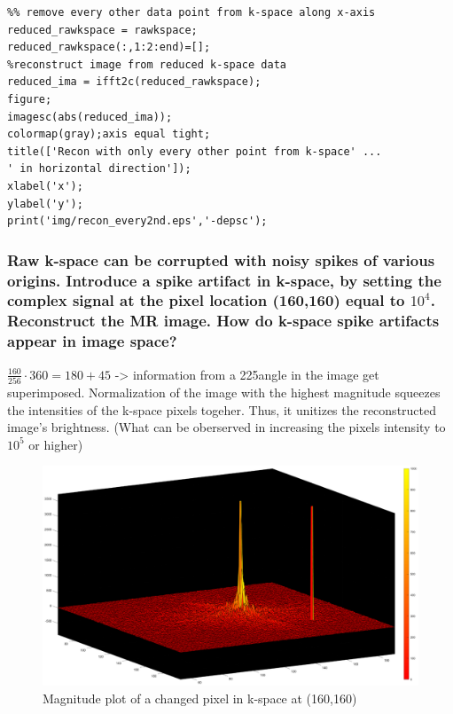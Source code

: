 \begin{lstlisting}
%% remove every other data point from k-space along x-axis
reduced_rawkspace = rawkspace;
reduced_rawkspace(:,1:2:end)=[];
%reconstruct image from reduced k-space data
reduced_ima = ifft2c(reduced_rawkspace);
figure;
imagesc(abs(reduced_ima));
colormap(gray);axis equal tight;
title(['Recon with only every other point from k-space' ...
' in horizontal direction']);
xlabel('x');
ylabel('y');
print('img/recon_every2nd.eps','-depsc');
\end{lstlisting}




\subsubsection{Raw k-space can be corrupted with noisy spikes of various origins. Introduce a spike
artifact in k-space, by setting the complex signal at the pixel location (160,160) equal to $10^4$. Reconstruct the MR image. How do k-space spike artifacts appear in image space?}


$\frac{160}{256} \cdot 360 = 180 + 45 $ -> information from a 225\textdegree angle in the image get superimposed. Normalization of the image with the highest magnitude squeezes the intensities of the k-space pixels togeher. Thus, it unitizes the reconstructed image's brightness. (What can be oberserved in increasing the pixels intensity to $10^5$ or higher) 

\begin{figure}[h!]
    \centering
    \includegraphics[width=\linewidth] {./homework4/img/Spike3d.eps}
    \caption{Magnitude plot of a changed pixel in k-space at (160,160)}
    \label{fig:recon_phase}
\end{figure}


